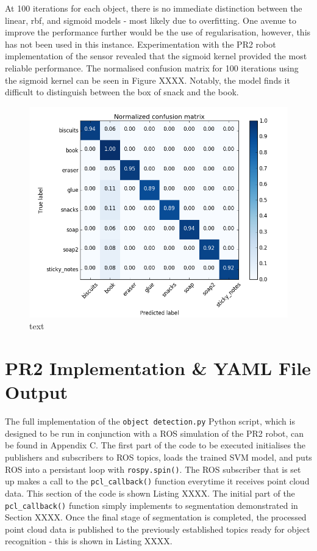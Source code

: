 \documentclass[a4paper]{article}
\begin{document}
At 100 iterations for each object, there is no immediate distinction between the linear, rbf, and sigmoid models - most likely due to overfitting. One avenue to improve the performance further would be the use of regularisation, however, this has not been used in this instance. Experimentation with the PR2 robot implementation of the sensor revealed that the sigmoid kernel provided the most reliable performance. The normalised confusion matrix for 100 iterations using the sigmoid kernel can be seen in Figure XXXX. Notably, the model finds it difficult to distinguish between the box of snack and the book.
\begin{figure}[h]
	\centering
	\includegraphics[scale=0.6]{normalised_confusion_matrix}
	\caption{text}
\end{figure}
\newpage

\section{PR2 Implementation \& YAML File Output}
The full implementation of the \verb|object detection.py| Python script, which is designed to be run in conjunction with a ROS simulation of the PR2 robot, can be found in Appendix C. The first part of the code to be executed initialises the publishers and subscribers to ROS topics, loads the trained SVM model, and puts ROS into a persistant loop with \verb|rospy.spin()|. The ROS subscriber that is set up makes a call to the \verb|pcl_callback()| function everytime it receives point cloud data. This section of the code is shown  Listing XXXX. The initial part of the \verb|pcl_callback()| function simply implements to segmentation demonstrated in Section XXXX. Once the final stage of segmentation is completed, the processed point cloud data is published to the previously established topics ready for object recognition - this is shown in Listing XXXX.\\
\end{document}
